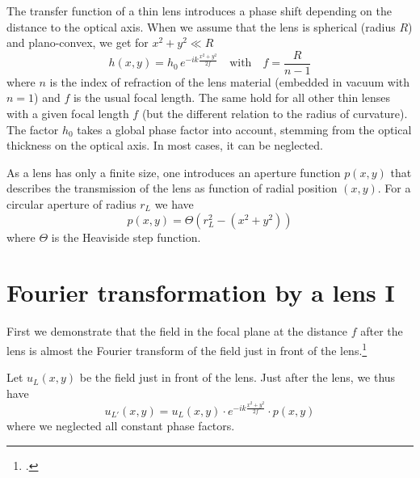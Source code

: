 The transfer function of a thin lens introduces a phase shift depending on the distance to the optical axis. When we assume that the lens is spherical (radius $R$) and plano-convex, we get for $x^2 + y^2 \ll R$
\begin{equation}
    h(x, y)  = h_0 \, e^{-i k \frac{x^2 + y^2}{2f}} \quad \text{with} \quad f = \frac{R}{n - 1}
\end{equation}
where $n$ is the index of  refraction of the lens material (embedded in vacuum with $n=1$) and $f$ is the usual focal length. The same hold for all other thin lenses with a given focal length $f$ (but the different relation to the radius of curvature). The factor $h_0$ takes a global phase factor into account, stemming from the optical thickness on the optical axis. In most cases, it can be neglected.

As a lens has only a finite size, one introduces an aperture function $p(x,y)$ that describes the transmission of the lens as function of radial position $(x,y)$. For a circular aperture of radius $r_L$ we have
\begin{equation}
    p(x,y) = \Theta \left(r_L^2  - ( x^2 + y^2) \right)
\end{equation}
where $\Theta$ is the Heaviside step function.


\section{Fourier transformation by a lens I}

First we demonstrate that  the field in the focal plane at the distance $f$ after the lens is almost the Fourier transform of the field just in front of the lens.\footcite[chapter 5.2.1]{Goodman2005}

Let $u_L(x,y)$ be the field just in front of the lens. Just after the lens, we thus have
\begin{equation}
    u_{L'}(x,y)  =  u_L(x,y) \cdot  e^{-i k \frac{x^2 + y^2}{2f}} \cdot p(x,y)
    \label{eq:micro_field_lens_lr}
\end{equation}
where we neglected all constant phase factors.


